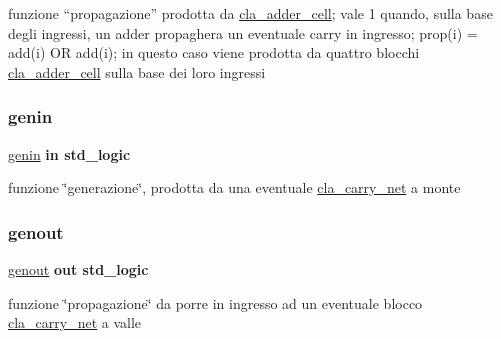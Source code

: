funzione “propagazione” prodotta da \hyperlink{classcla__adder__cell}{cla\+\_\+adder\+\_\+cell}; vale 1 quando, sulla base degli ingressi, un adder propaghera\textquotesingle{} un eventuale carry in ingresso; prop(i) = add(i) OR add(i); in questo caso viene prodotta da quattro blocchi \hyperlink{classcla__adder__cell}{cla\+\_\+adder\+\_\+cell} sulla base dei loro ingressi \mbox{\label{group___carry_network_ga0a46d5193cb73eb993bc5d4f69741d0a}} 
\subsubsection{\texorpdfstring{genin}{genin}}
{\footnotesize\ttfamily \hyperlink{group___carry_network_ga0a46d5193cb73eb993bc5d4f69741d0a}{genin} {\bfseries \textcolor{vhdlchar}{in}\textcolor{vhdlchar}{ }} {\bfseries \textcolor{vhdlchar}{std\+\_\+logic}\textcolor{vhdlchar}{ }} \hspace{0.3cm}{\ttfamily [Port]}}



funzione \char`\"{}generazione\char`\"{}, prodotta da una eventuale \hyperlink{classcla__carry__net}{cla\+\_\+carry\+\_\+net} a monte 

\mbox{\label{group___carry_network_ga068cd5c4d23e284cb942702252ed1491}} 
\subsubsection{\texorpdfstring{genout}{genout}}
{\footnotesize\ttfamily \hyperlink{group___carry_network_ga068cd5c4d23e284cb942702252ed1491}{genout} {\bfseries \textcolor{vhdlchar}{out}\textcolor{vhdlchar}{ }} {\bfseries \textcolor{vhdlchar}{std\+\_\+logic}\textcolor{vhdlchar}{ }} \hspace{0.3cm}{\ttfamily [Port]}}

funzione \char`\"{}propagazione\char`\"{} da porre in ingresso ad un eventuale blocco \hyperlink{classcla__carry__net}{cla\+\_\+carry\+\_\+net} a valle \mbox{\label{group___carry_network_gac1f84cd3374a5a4d2ee2669ebdadafe8}} 
